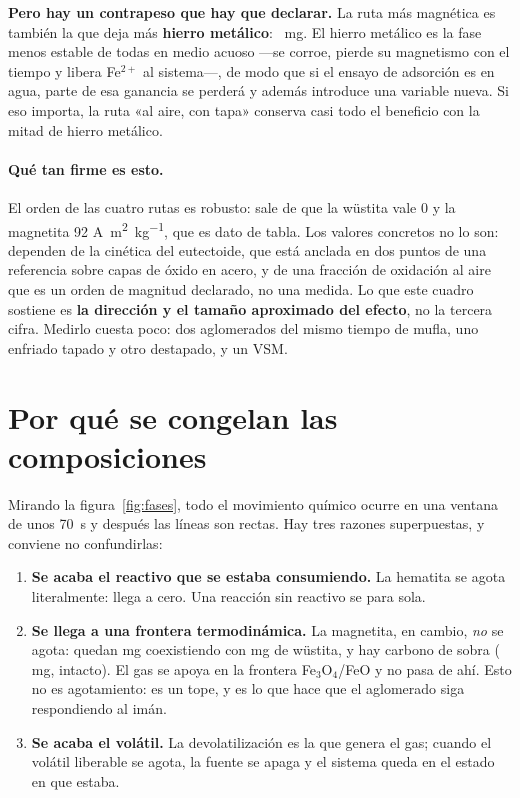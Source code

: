 \documentclass[11pt,a4paper]{article}
\newcommand{\ojo}[1]{\textcolor{aviso}{\textbf{#1}}}
\begin{document}
\ojo{Pero hay un contrapeso que hay que declarar.} La ruta más magnética es
también la que deja más \textbf{hierro metálico}: \datFeMetalMejorRuta\
\si{\milli\gram}. El hierro metálico es la fase menos estable de todas en medio
acuoso ---se corroe, pierde su magnetismo con el tiempo y libera Fe$^{2+}$ al
sistema---, de modo que si el ensayo de adsorción es en agua, parte de esa
ganancia se perderá y además introduce una variable nueva. Si eso importa, la
ruta «al aire, con tapa» conserva casi todo el beneficio con la mitad de hierro
metálico.

\paragraph{Qué tan firme es esto.} El orden de las cuatro rutas es robusto: sale
de que la wüstita vale 0 y la magnetita 92
\si{\ampere\meter\squared\per\kilo\gram}, que es dato de tabla. Los valores
concretos no lo son: dependen de la cinética del eutectoide, que está anclada en
dos puntos de una referencia sobre capas de óxido en acero, y de una fracción de
oxidación al aire que es un orden de magnitud declarado, no una medida. Lo que
este cuadro sostiene es \textbf{la dirección y el tamaño aproximado del efecto},
no la tercera cifra. Medirlo cuesta poco: dos aglomerados del mismo tiempo de
mufla, uno enfriado tapado y otro destapado, y un VSM.

\section{Por qué se congelan las composiciones}

Mirando la figura~\ref{fig:fases}, todo el movimiento químico ocurre en una
ventana de unos \SI{70}{\second} y después las líneas son rectas. Hay tres
razones superpuestas, y conviene no confundirlas:

\begin{enumerate}[leftmargin=*]
  \item \textbf{Se acaba el reactivo que se estaba consumiendo.} La hematita se
        agota literalmente: llega a cero. Una reacción sin reactivo se para
        sola.
  \item \textbf{Se llega a una frontera termodinámica.} La magnetita, en
        cambio, \emph{no} se agota: quedan \datMagnetitaFinal{} \si{\milli\gram}
        coexistiendo con \datFeo{} \si{\milli\gram} de wüstita, y hay carbono de
        sobra (\datCarbono{} \si{\milli\gram}, intacto). El gas se apoya en la
        frontera Fe$_3$O$_4$/FeO y no pasa de ahí. Esto no es agotamiento: es un
        tope, y es lo que hace que el aglomerado siga respondiendo al imán.
  \item \textbf{Se acaba el volátil.} La devolatilización es la que genera el
        gas; cuando el volátil liberable se agota, la fuente se apaga y el
        sistema queda en el estado en que estaba.
\end{enumerate}
\end{document}
